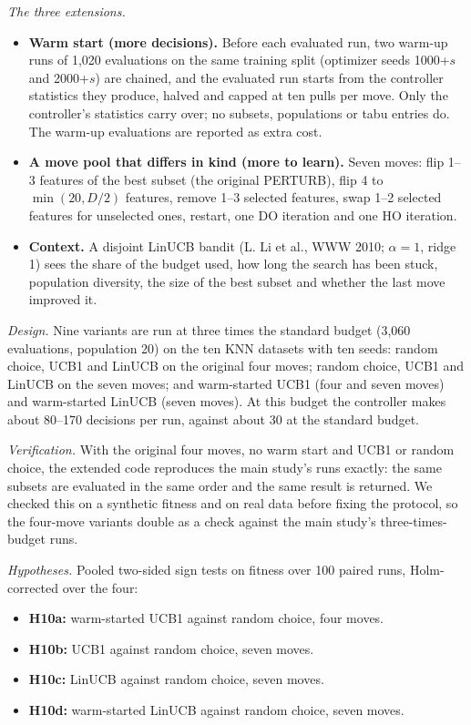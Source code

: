 \documentclass[journal]{IEEEtran}
\begin{document}
\emph{The three extensions.}
\begin{itemize}
\item \textbf{Warm start (more decisions).} Before each evaluated run, two warm-up runs of 1,020 evaluations on the same training split (optimizer seeds 1000+$s$ and 2000+$s$) are chained, and the evaluated run starts from the controller statistics they produce, halved and capped at ten pulls per move. Only the controller's statistics carry over; no subsets, populations or tabu entries do. The warm-up evaluations are reported as extra cost.
\item \textbf{A move pool that differs in kind (more to learn).} Seven moves: flip 1--3 features of the best subset (the original PERTURB), flip 4 to $\min(20, D/2)$ features, remove 1--3 selected features, swap 1--2 selected features for unselected ones, restart, one DO iteration and one HO iteration.
\item \textbf{Context.} A disjoint LinUCB bandit (L. Li et al., WWW 2010; $\alpha=1$, ridge 1) sees the share of the budget used, how long the search has been stuck, population diversity, the size of the best subset and whether the last move improved it.
\end{itemize}

\emph{Design.} Nine variants are run at three times the standard budget (3,060 evaluations, population 20) on the ten KNN datasets with ten seeds: random choice, UCB1 and LinUCB on the original four moves; random choice, UCB1 and LinUCB on the seven moves; and warm-started UCB1 (four and seven moves) and warm-started LinUCB (seven moves). At this budget the controller makes about 80--170 decisions per run, against about 30 at the standard budget.

\emph{Verification.} With the original four moves, no warm start and UCB1 or random choice, the extended code reproduces the main study's runs exactly: the same subsets are evaluated in the same order and the same result is returned. We checked this on a synthetic fitness and on real data before fixing the protocol, so the four-move variants double as a check against the main study's three-times-budget runs.

\emph{Hypotheses.} Pooled two-sided sign tests on fitness over 100 paired runs, Holm-corrected over the four:
\begin{itemize}
\item \textbf{H10a:} warm-started UCB1 against random choice, four moves.
\item \textbf{H10b:} UCB1 against random choice, seven moves.
\item \textbf{H10c:} LinUCB against random choice, seven moves.
\item \textbf{H10d:} warm-started LinUCB against random choice, seven moves.
\end{itemize}
\end{document}
